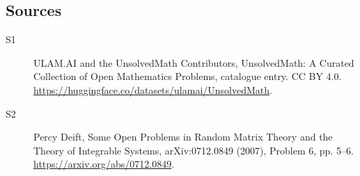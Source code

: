 \documentclass[11pt]{article}
\begin{document}
\subsection{Sources}
\begin{description}
\item[\hypertarget{source:statement:1}{S1}] ULAM.AI and the UnsolvedMath Contributors, UnsolvedMath: A Curated Collection of Open Mathematics Problems, catalogue entry. CC BY 4.0. \url{https://huggingface.co/datasets/ulamai/UnsolvedMath}.
\item[\hypertarget{source:statement:2}{S2}] Percy Deift, Some Open Problems in Random Matrix Theory and the Theory of Integrable Systems, arXiv:0712.0849 (2007), Problem 6, pp. 5--6. \url{https://arxiv.org/abs/0712.0849}.
\end{description}
\label{end:statement}
\end{document}
